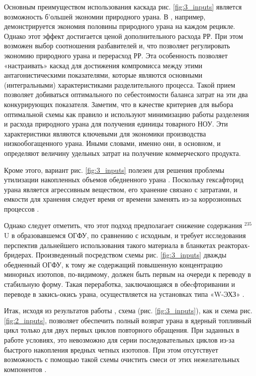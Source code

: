 Основным преимуществом использования каскада рис. \ref{fig:3_inputs} является возможность б'ольшей экономии природного урана.
В \cite{smirnovApplyingEnrichmentCapacities2018}, например, демонстрируется экономия половины природного урана на каждом рецикле.
Однако этот эффект достигается ценой дополнительного расхода РР. При этом возможен выбор соотношения разбавителей и, что позволяет регулировать экономию природного урана и перерасход РР.
Эта особенность позволяет «настраивать» каскад для достижения компромисса между этими антагонистическими показателями, которые являются основными (интегральными) характеристиками разделительного процесса.
Такой прием позволяет добиваться оптимального по себестоимости баланса затрат на эти два конкурирующих показателя.
Заметим, что в качестве критериев для выбора оптимальной схемы как правило и используют минимизацию работы разделения и расхода природного урана для получения единицы товарного НОУ. Эти характеристики являются ключевыми для экономики производства низкообогащенного урана. Иными словами, именно они, в основном, и определяют величину удельных затрат на получение коммерческого продукта.

Кроме этого, вариант рис. \ref{fig:3_inputs} полезен для решения проблемы утилизации накопленных объемов обедненного урана \cite{smirnovEnrichmentRegeneratedUranium2014}. Поскольку гексафторид урана является агрессивным веществом, его хранение связано с затратами, и емкости для хранения следует время от времени заменять из-за коррозионных процессов \cite{fitchOPTIONSDISPOSALREAPPLICATION2009, oecdManagementDepletedUranium2001}.

Однако следует отметить, что этот подход предполагает снижение содержания $^{235}$U в образовавшемся ОГФУ, по сравнению с исходным, и требует исследования перспектив дальнейшего использования такого материала в бланкетах реакторах-бридерах.
Произведенный посредством схемы рис. \ref{fig:3_inputs} дважды обедненный ОГФУ, к тому же содержащий повышенную концентрацию минорных изотопов, по-видимому, должен быть первым на очереди к переводу в стабильную форму. Такая переработка, заключающаяся в обеcфторивании и переводе в закись-окись урана, осуществляется на установках типа «W-ЭХЗ» \cite{PererabotkaOGFUObrazovaniem2014}.

Итак, исходя из результатов работы \cite{smirnovApplyingEnrichmentCapacities2018}, схема (рис. \ref{fig:3_inputs}), как и схема рис. \ref{fig:2_inputs}, позволяет обеспечить полный возврат урана в ядерный топливный цикл только для двух первых циклов повторного обращения.
При заданных в работе \cite{smirnovApplyingEnrichmentCapacities2018} условиях, это невозможно для серии последовательных циклов из-за быстрого накопления вредных четных изотопов. При  этом отсутствует возможность с помощью такой схемы очистить смеси от этих нежелательных компонентов \cite{smirnovApplyingEnrichmentCapacities2018}.

